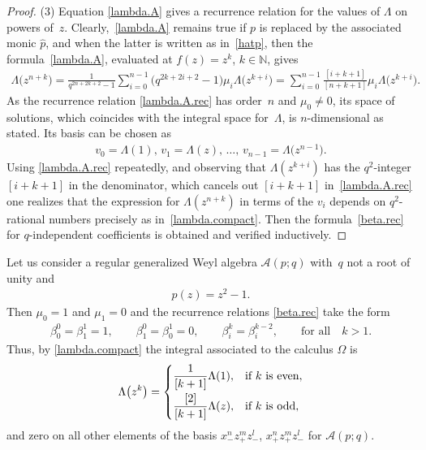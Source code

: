 \documentclass[pdftex]{sigma}
\numberwithin{equation}{section}
\def\AWeyl#1#2{{\mathcal{A}}(#1;#2)}
\begin{document}
\begin{proof}
(3) Equation \eqref{lambda.A} gives a recurrence relation for the values of $\Lambda$ on powers of~$z$. Clearly,~\eqref{lambda.A} remains true if $p$ is replaced by the associated monic $\hat{p}$, and when the latter is written as in~\eqref{hatp}, then
the formula~\eqref{lambda.A}, evaluated at $f(z)= z^k$, $k\in {\mathbb N}$, gives
\begin{gather}
\Lambda\big(z^{n+k}\big) = \frac{1}{q^{2n +2k +2} -1}\sum_{i=0}^{n-1}\big(q^{2k +2i +2} -1\big) \mu_i\Lambda\big(z^{k+i}\big)
 = \sum_{i=0}^{n-1} \frac{[i+k+1]}{[n+k+1]}\mu_i \Lambda\big(z^{k+i}\big).\label{lambda.A.rec}
\end{gather}
As the recurrence relation \eqref{lambda.A.rec} has order~$n$ and $\mu_0\neq 0$, its space of solutions, which coincides with the integral space for~$\Lambda$, is $n$-dimensional as stated. Its basis can be chosen as
\begin{gather*}
v_0 = \Lambda(1),\, v_1 = \Lambda(z), \,\ldots ,\, v_{n-1} = \Lambda\big(z^{n-1}\big).
\end{gather*}
Using \eqref{lambda.A.rec} repeatedly, and observing that $\Lambda(z^{k+i})$ has the $q^2$-integer $[i+k+1]$ in the de\-no\-mi\-nator, which cancels out $[i+k+1]$ in~\eqref{lambda.A.rec} one realizes that the expression for $\Lambda(z^{n+k})$ in terms of the $v_i$ depends on $q^2$-rational numbers precisely as in~\eqref{lambda.compact}. Then the formula~\eqref{beta.rec} for $q$-independent coef\/f\/icients is obtained and verif\/ied inductively.
\end{proof}

\begin{Example}\label{ex.lambda}
Let us consider a regular generalized Weyl algebra $\AWeyl p q$ with~$q$ not a root of unity and
\begin{gather*}
p(z) = z^2 -1.
\end{gather*}
Then $\mu_0 = 1$ and $\mu_1 = 0$ and the recurrence relations \eqref{beta.rec} take the form
\begin{gather*}
\beta^0_0 = \beta^1_1 = 1, \qquad \beta^0_1 = \beta^1_0 = 0, \qquad \beta^k_i = \beta^{k-2}_i, \qquad \mbox{for all} \quad k>1.
\end{gather*}
Thus, by \eqref{lambda.compact} the integral associated to the calculus $\Omega$ is
\begin{gather*}
\Lambda \big(z^k\big) =
\begin{cases} \dfrac{1}{[k +1]} \Lambda (1), & \mbox{if $k$ is even},\vspace{1mm}\\
\dfrac{[2]}{[k +1]} \Lambda (z), & \mbox{if $k$ is odd},
\end{cases}
\end{gather*}
and zero on all other elements of the basis $x_-^nz_+^mz_-^l$, $x_+^nz_+^mz_-^l$ for $\AWeyl p q$.
\end{Example}
\end{document}

